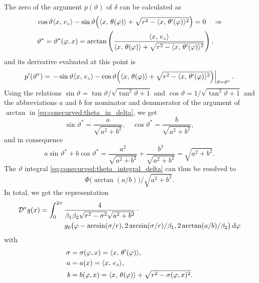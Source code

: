 \documentclass{amsart}
\renewcommand*{\phi}{\varphi}
\begin{document}
%
The zero of the argument $p(\vartheta)$ of $\delta$ can be calculated as
%
\begin{align}
 &\cos\vartheta \INNER{x}{e_z} - \sin\vartheta \Big( \INNER{x}{\theta(\phi)} + \sqrt{r^2 - \INNER{x}{\theta'(\phi)}^2} \Big) = 0 \quad
 \Rightarrow \notag \\
 \label{eq:conecurved:theta_in_delta}
 & \vartheta^* = \vartheta^*(\phi, x) = \arctan \left( \frac{\INNER{x}{e_z}}{\INNER{x}{\theta(\phi)} + \sqrt{r^2 - 
 \INNER{x}{\theta'(\phi)}^2}} \right),
\end{align}
%
and its derivative evaluated at this point is
%
\begin{equation*}
 p'(\vartheta^*) = \left. -\sin\vartheta \INNER{x}{e_z} - \cos\vartheta \Big( \INNER{x}{\theta(\phi)} + \sqrt{r^2 - 
 \INNER{x}{\theta'(\phi)}^2} \Big) \right|_{\vartheta = \vartheta^*}.
\end{equation*}
%
Using the relations $\sin\vartheta = \tan\vartheta / \sqrt{\tan^2\vartheta + 1}$ and $\cos\vartheta = 1 / \sqrt{\tan^2\vartheta + 1}$ and 
the abbreviations $a$ and $b$ for nominator and denumerator of the argument of $\arctan$ in \eqref{eq:conecurved:theta_in_delta}, we get 
%
\begin{equation*}
 \sin\vartheta^* = \frac{a}{\sqrt{a^2 + b^2}}, \quad \cos\vartheta^* = \frac{b}{\sqrt{a^2 + b^2}},
\end{equation*}
%
and in consequence
%
\begin{equation*}
 a\sin\vartheta^* + b\cos\vartheta^* = \frac{a^2}{\sqrt{a^2 + b^2}} + \frac{b^2}{\sqrt{a^2 + b^2}} = \sqrt{a^2 + b^2}.
\end{equation*}
%
The $\vartheta$ integral \eqref{eq:conecurved:theta_integral_delta} can thus be resolved to
%
\begin{equation*}
 \Phi\big(\arctan(a/b)\big) / \sqrt{a^2 + b^2}.
\end{equation*}
%
In total, we get the representation
%
\begin{align}
 \label{eq:conecurved:backproj}
 \DUALOPD g(x)
 &= \int_0^{2\pi} \frac{4}{\beta_1\beta_2\sqrt{r^2 - \sigma^2} \sqrt{a^2 + b^2}} \cdot \phantom{x} \\
 &\hspace{35pt} g_0 \big( \phi - \arcsin(\sigma/r), 2\arcsin(\sigma/r)/\beta_1, 2\arctan(a/b)/\beta_2 \big)\, \D\phi \notag
\end{align}
%
with
%
\begin{align}
 \label{eq:conecurved:bp_sigma}
 \sigma &= \sigma(\phi, x) = \INNER{x}{\theta'(\phi)}, \\
 \label{eq:conecurved:bp_a}
 a &= a(x) = \INNER{x}{e_z}, \\
 \label{eq:conecurved:bp_b}
 b &= b(\phi, x) = \INNER{x}{\theta(\phi)} + \sqrt{r^2 - \sigma(\phi,x)^2}.
\end{align}
\vspace{5ex}%
\end{document}
